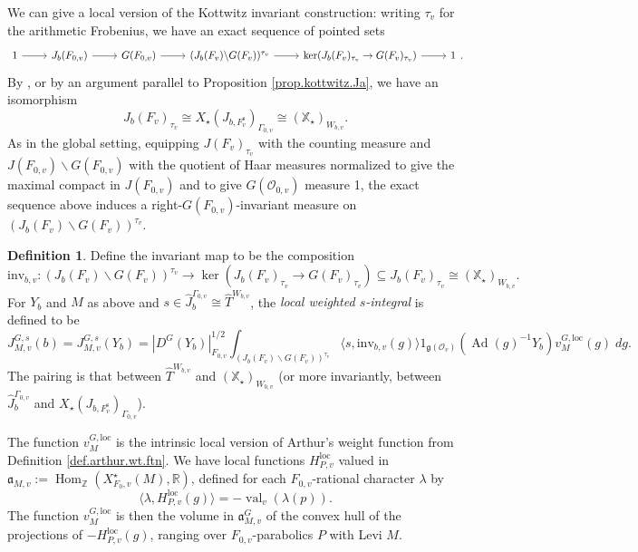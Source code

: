 \documentclass[openany]{amsbook}
\theoremstyle{definition}
\newtheorem{definition}[theorem]{Definition}
\theoremstyle{remark}
\numberwithin{equation}{section}
\newcommand{\R}{\mathbb{R}}
\newcommand{\Z}{\mathbb{Z}}
\renewcommand{\O}{\mathcal{O}}
\newcommand{\val}{\on{val}}
\renewcommand{\-}{\operatorname{-}}
\newcommand{\Hom}{\operatorname{Hom}}
\renewcommand{\a}{\mathfrak{a}}
\newcommand{\on}[1]{\operatorname{#1}}
\newcommand{\bX}{\mathbb{X}}
\renewcommand{\fg}{\mathfrak{g}}
\newcommand{\sep}{\text{s}}
\newcommand{\Ad}{\on{Ad}}
\newcommand{\inv}{\mathrm{inv}}
\newcommand{\loc}{\mathrm{loc}}
\begin{document}
We can give a local version of the Kottwitz invariant construction: writing $\tau_v$ for the arithmetic Frobenius, we have an exact sequence of pointed sets
$$
    \begin{tikzcd}[ampersand replacement=\&]
        1 \ar[r] \& J_b(F_{0,v}) \ar[r] \& G(F_{0,v}) \ar[r] \& (J_b(F_v) \backslash G(F_v))^{\tau_v} \ar[r] \& \ker(J_b(F_v)_{\tau_v} \to G(F_v)_{\tau_v}) \ar[r] \& 1
    \end{tikzcd}.
$$
By \cite[\S7.6]{kottwitzisocrystalsii}, or by an argument parallel to Proposition \ref{prop.kottwitz.Ja}, we have an isomorphism
$$
    J_b(F_v)_{\tau_v} \cong X_\star(J_{b, F_v^{\sep}})_{\Gamma_{0,v}} \cong (\bX_\star)_{W_{b,v}}.
$$
As in the global setting, equipping $J(F_{v})_{\tau_v}$ with the counting measure and $J(F_{0,v})\backslash G(F_{0,v})$ with the quotient of Haar measures normalized to give the maximal compact in $J(F_{0,v})$ and to give $G(\O_{0,v})$ measure 1, the exact sequence above induces a right-$G(F_{0,v})$-invariant measure on $(J_b(F_v) \backslash G(F_v))^{{\tau_v}}$.


\begin{definition}\label{def.local.s.integral}
    Define the invariant map to be the composition
    $$
        \inv_{b,v} : (J_b(F_v)\backslash G(F_v))^{\tau_v} \to \ker(J_b(F_v)_{\tau_v} \to G(F_v)_{\tau_v}) \subseteq J_b(F_v)_{\tau_v} \cong (\bX_\star)_{W_{b,v}}.
    $$
    For $Y_b$ and $M$ as above and $s \in \widehat{J}_b^{\Gamma_{0,v}} \cong \widehat{T}^{W_{b,v}}$, the \emph{local weighted $s$-integral} is defined to be
    $$
        J_{M,v}^{G,s}(b) = J_{M,v}^{G,s}(Y_b)= |D^G(Y_b)|_{F_{0,v}}^{1/2} \int_{(J_b(F_v) \backslash G(F_v))^{{\tau_v}}} \langle s, \inv_{b,v}(g) \rangle 1_{\fg(\O_v)}(\Ad(g)^{-1} Y_b) v_M^{G, \loc}(g) \; dg.
    $$
    The pairing is that between $\widehat{T}^{W_{b,v}}$ and $(\bX_\star)_{W_{b,v}}$ (or more invariantly, between $\widehat{J}_b^{\Gamma_{0,v}}$ and $ X_\star(J_{b, F_v^{\sep}})_{\Gamma_{0,v}}$).
    
    The function $v_M^{G, \loc}$ is the intrinsic local version of Arthur's weight function from Definition \ref{def.arthur.wt.ftn}. We have local functions $H_{P,v}^{\loc}$ valued in $\a_{M,v} := \Hom_{\Z}(X^\star_{F_0,v}(M), \R)$, defined for each $F_{0,v}$-rational character $\lambda$ by
    $$
        \langle \lambda, H_{P,v}^{\loc}(g) \rangle = - \val_v(\lambda(p)).
    $$
    The function $v_M^{G, \loc}$ is then the volume in $\a_{M,v}^G$ of the convex hull of the projections of $-H_{P,v}^{\loc}(g)$, ranging over $F_{0,v}$-parabolics $P$ with Levi $M$.
\end{definition}
\end{document}

